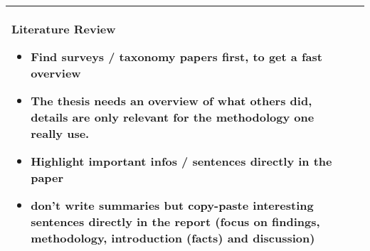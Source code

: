 \documentclass[a4paper,11pt]{article}
\begin{document}
\begin{longtable}{|p{4cm}|p{10cm}|}
		Literature Review
		\begin{itemize}
			\item Find surveys / taxonomy papers first, to get a fast overview
			\item The thesis needs an overview of what others did, details are only relevant for the methodology one really use.
			\item Highlight important infos / sentences directly in the paper
			\item don't write summaries but copy-paste interesting sentences directly in the report (focus on findings, methodology, introduction (facts) and discussion)
		\end{itemize} \\
		\hline
	\end{longtable}
	
\end{document}

